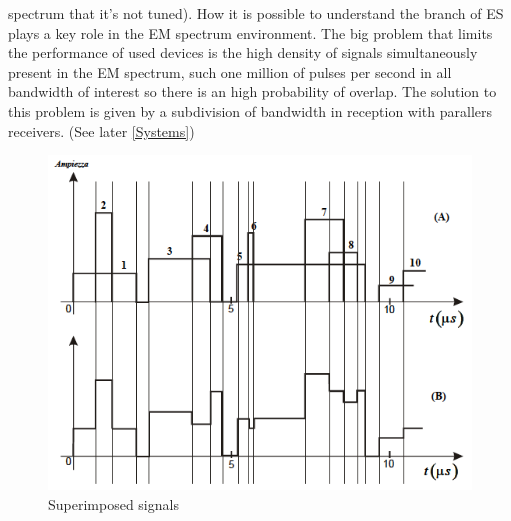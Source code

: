 \documentclass[12pt]{report}
\begin{document}
spectrum that it's not tuned). How it is possible to understand the branch of ES plays a key role in the EM spectrum environment. The big problem that limits the performance of used devices is the high density of signals simultaneously present in the EM spectrum, such one million of pulses per second in all bandwidth of interest so there is an high probability of overlap. The solution to this problem is given by a subdivision of bandwidth in reception with parallers receivers. (See later \ref{Systems})
\begin{figure}[b!]
    \centering
    \includegraphics[width=12cm]{Pictures/BW subivision.png}
    \caption{Superimposed signals}
\end{figure}

\newpage
\end{document}
